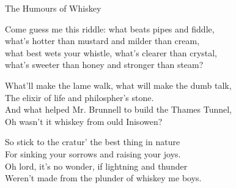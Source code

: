 \begin{song}{The Humours of Whiskey}
	
	
	
	Come guess me this riddle: what beats pipes and fiddle,\\
	what’s hotter than mustard and milder than cream,\\
	what best wets your whistle, what’s clearer than crystal,\\
	what’s sweeter than honey and stronger than steam?

	What’ll make the lame walk, what will make the dumb talk,\\
	The elixir of life and philospher’s stone.\\
	And what helped Mr. Brunnell to build the Thames Tunnel,\\
	Oh wasn’t it whiskey from ould Inisowen?

	So stick to the cratur’ the best thing in nature\\
	For sinking your sorrows and raising your joys.\\
	Oh lord, it’s no wonder, if lightning and thunder\\
	Weren’t made from the plunder of whiskey me boys.
	
\end{song}
